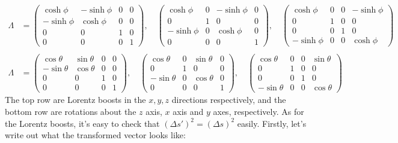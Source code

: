 \begin{align*}
	\Lambda &= \begin{pmatrix} \cosh \phi & -\sinh \phi & 0 & 0\\ -\sinh \phi & \cosh \phi & 0 & 0\\ 0 &0 & 1
	& 0\\ 0 & 0 & 0 & 1\end{pmatrix}, \quad \begin{pmatrix} \cosh \phi & 0 & -\sinh \phi & 0\\ 0 & 1 & 0 & 0
		\\ -\sinh \phi & 0 & \cosh \phi & 0\\ 0 & 0 & 0 & 1\end{pmatrix}, \quad \begin{pmatrix} \cosh \phi &
	0 & 0 & -\sinh \phi\\ 0 & 1 &0 & 0 \\ 0 & 0 & 1 & 0\\ -\sinh \phi & 0 & 0 & \cosh \phi\end{pmatrix}\\
	\\
		\Lambda &= \begin{pmatrix} \cos \theta & \sin \theta & 0 & 0 \\ -\sin \theta & \cos \theta & 0 & 0 \\
			0  &0 & 1 & 0\\ 0 & 0 & 0 & 1 \end{pmatrix}, \quad \begin{pmatrix} \cos \theta & 0 & \sin \theta
			   & 0 \\ 0 & 1 & 0 & 0 \\ -\sin \theta & 0 & \cos \theta & 0 \\ 0 & 0 & 0 & 1\end{pmatrix}, \quad
			\begin{pmatrix} \cos \theta & 0 & 0 & \sin \theta \\ 0 & 1 &0 & 0\\ 0 & 0 & 1 & 0\\ -\sin \theta
			& 0 & 0 & \cos \theta\end{pmatrix}
\end{align*}
The top row are Lorentz boosts in the \( x, y, z \) directions respectively, and the bottom row are rotations
about the \( z \) axis, \( x \) axis and \( y \) axes, respectively. As for the Lorentz boosts, it's easy to
check that \( (\Delta s')^2 = (\Delta s)^2 \) easily. Firstly, let's write out what the transformed vector
looks like:

